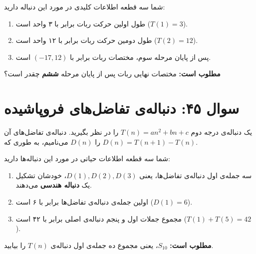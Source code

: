 \documentclass[12pt]{article}
\begin{document}
	شما سه قطعه اطلاعات کلیدی در مورد این دنباله دارید:
	\begin{enumerate}[label=(\roman*)]
		\item طول اولین حرکت ربات برابر با ۳ واحد است (\(T(1) = 3\)).
		\item طول دومین حرکت ربات برابر با ۱۲ واحد است (\(T(2) = 12\)).
		\item پس از پایان مرحله سوم، مختصات ربات برابر با \( (-17, 12) \) است.
	\end{enumerate}
	\vspace{0.5cm}
	
	\textbf{مطلوب است:} مختصات نهایی ربات پس از پایان مرحله \textbf{ششم} چقدر است؟
	
	\vspace{1cm}
	\hrulefill
	\vspace{1cm}
	
	\section*{سوال ۴۵: دنباله‌ی تفاضل‌های فروپاشیده}
	یک دنباله‌ی درجه دوم \( T(n) = an^2 + bn + c \) را در نظر بگیرید. دنباله‌ی تفاضل‌های آن را \(D(n)\) می‌نامیم، به طوری که \( D(n) = T(n+1) - T(n) \).
	\vspace{0.5cm}
	
	شما سه قطعه اطلاعات حیاتی در مورد این دنباله‌ها دارید:
	\begin{enumerate}[label=(\roman*)]
		\item سه جمله‌ی اول دنباله‌ی تفاضل‌ها، یعنی \(D(1), D(2), D(3)\)، خودشان تشکیل یک \textbf{دنباله هندسی} می‌دهند.
		\item اولین جمله‌ی دنباله‌ی تفاضل‌ها برابر با ۶ است (\(D(1) = 6\)).
		\item مجموع جملات اول و پنجم دنباله‌ی اصلی برابر با ۴۲ است (\(T(1) + T(5) = 42\)).
	\end{enumerate}
	\vspace{0.5cm}
	
	\textbf{مطلوب است:} \(S_{10}\)، یعنی مجموع ده جمله‌ی اول دنباله‌ی \(T(n)\) را بیابید.
	
	\vspace{1cm}
	\hrulefill
	\vspace{1cm}
	
\end{document}
